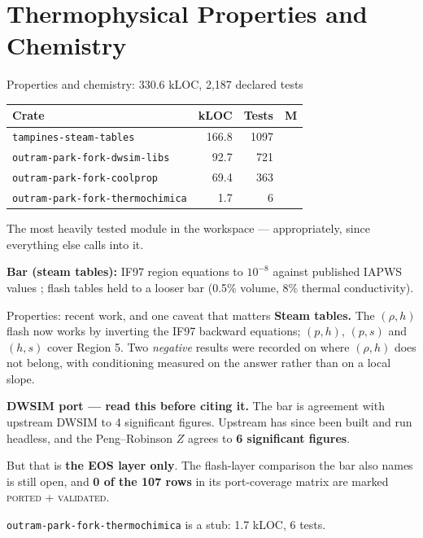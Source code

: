 \documentclass[aspectratio=169]{beamer}
\newcommand{\statustab}[1]{{\footnotesize\setlength{\tabcolsep}{4pt}#1}}
\begin{document}
\section{Thermophysical Properties and Chemistry}

\begin{frame}{Properties and chemistry: 330.6 kLOC, 2{,}187 declared tests}
    \statustab{
    \begin{tabular}{lrrc}
        \toprule
        \textbf{Crate} & \textbf{kLOC} & \textbf{Tests} & \textbf{M} \\
        \midrule
        \texttt{tampines-steam-tables}          & 166.8 & 1097 & \checkmark \\
        \texttt{outram-park-fork-dwsim-libs}    &  92.7 &  721 & \checkmark \\
        \texttt{outram-park-fork-coolprop}      &  69.4 &  363 & \\
        \texttt{outram-park-fork-thermochimica} &   1.7 &    6 & \\
        \bottomrule
    \end{tabular}}

    \medskip
    The most heavily tested module in the workspace --- appropriately, since
    everything else calls into it.

    \medskip
    \textbf{Bar (steam tables):} IF97 region equations to $10^{-8}$ against
    published IAPWS values \parencite{wagner2000iapws}; flash tables held to a
    looser bar (0.5\% volume, 8\% thermal conductivity).
\end{frame}

\begin{frame}{Properties: recent work, and one caveat that matters}
    \textbf{Steam tables.} The $(\rho,h)$ flash now works by inverting the IF97
    backward equations; $(p,h)$, $(p,s)$ and $(h,s)$ cover Region 5. Two
    \emph{negative} results were recorded on where $(\rho,h)$ does not belong,
    with conditioning measured on the answer rather than on a local slope.

    \medskip
    \textbf{DWSIM port --- read this before citing it.} The bar is agreement
    with upstream DWSIM \parencite{dwsim} to 4 significant figures. Upstream
    has since been built and run headless, and the Peng--Robinson $Z$ agrees to
    \textbf{6 significant figures}.

    \medskip
    But that is \textbf{the EOS layer only}. The flash-layer comparison the bar
    also names is still open, and \textbf{0 of the 107 rows} in its
    port-coverage matrix are marked \textsc{ported + validated}.

    \medskip
    \texttt{outram-park-fork-thermochimica} \parencite{piro2013thermochimica}
    is a stub: 1.7 kLOC, 6 tests.
\end{frame}
\end{document}
